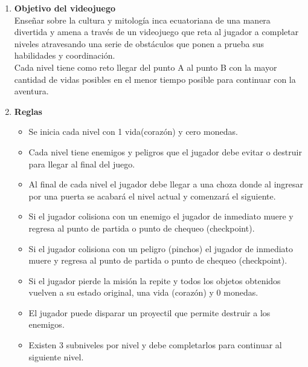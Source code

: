 \documentclass[a4paper, openright, 12pt]{report}
\begin{document}
\begin{enumerate}
\item \textbf{Objetivo del videojuego}\\
Enseñar sobre la cultura y mitología inca ecuatoriana de una manera divertida y amena a través de un videojuego que reta al jugador a completar niveles atravesando una serie de obstáculos que ponen a prueba sus habilidades y coordinación.\\
Cada nivel tiene como reto llegar del punto A al punto B con la mayor cantidad de vidas posibles en el menor tiempo posible para continuar con la aventura. 
\item \textbf{Reglas}\\
\begin{itemize}
\item Se inicia cada nivel con 1 vida(corazón) y cero monedas.
\item Cada nivel tiene enemigos y peligros que el jugador debe evitar o destruir para llegar al final del juego.
\item Al final de cada nivel el jugador debe llegar a una choza donde al ingresar por una puerta se acabará el nivel actual y comenzará el siguiente.
\item Si el jugador colisiona con un enemigo el jugador de inmediato muere y regresa al punto de partida o punto de chequeo (checkpoint).
\item Si el jugador colisiona con un peligro (pinchos) el jugador de inmediato muere y regresa al punto de partida o punto de chequeo (checkpoint).
\item Si el jugador pierde la misión la repite y todos los objetos obtenidos vuelven a su estado original, una vida (corazón) y 0 monedas.
\item El jugador puede disparar un proyectil que permite destruir a los enemigos.
\item Existen 3 subniveles por nivel y debe completarlos para continuar al siguiente nivel.
\end{itemize}
\end{enumerate}   
\end{document}
